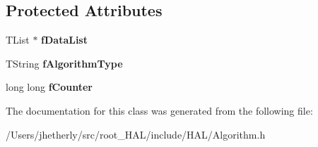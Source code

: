 \subsection*{Protected Attributes}
\begin{DoxyCompactItemize}
\item 
\hypertarget{class_h_a_l_1_1_algorithm_aacc4824bcc223fc86f0f57662393e56c}{T\-List $\ast$ {\bfseries f\-Data\-List}}\label{class_h_a_l_1_1_algorithm_aacc4824bcc223fc86f0f57662393e56c}

\item 
\hypertarget{class_h_a_l_1_1_algorithm_a15bbd1834a2413957b2946e051584d49}{T\-String {\bfseries f\-Algorithm\-Type}}\label{class_h_a_l_1_1_algorithm_a15bbd1834a2413957b2946e051584d49}

\item 
\hypertarget{class_h_a_l_1_1_algorithm_a91a834bebb25ccc2e4324fcaf51bf294}{long long {\bfseries f\-Counter}}\label{class_h_a_l_1_1_algorithm_a91a834bebb25ccc2e4324fcaf51bf294}

\end{DoxyCompactItemize}


The documentation for this class was generated from the following file\-:\begin{DoxyCompactItemize}
\item 
/\-Users/jhetherly/src/root\-\_\-\-H\-A\-L/include/\-H\-A\-L/Algorithm.\-h\end{DoxyCompactItemize}
